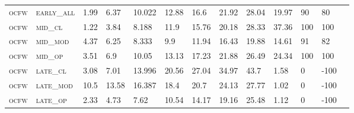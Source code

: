 \begin{landscape}
\begin{table}[!htbp]
\begin{tabular}{@{}lllllllllllll@{}}
\footnotesize \textsc{ocfw}        & \footnotesize \textsc{early\_all}                & \footnotesize 1.99          & \footnotesize 6.37           & \footnotesize 10.022           & \footnotesize 12.88           & \footnotesize 16.6            & \footnotesize 21.92           & \footnotesize 28.04      & \footnotesize 19.97    & \footnotesize 90     & \footnotesize 80    \\
\footnotesize \textsc{ocfw}        & \footnotesize \textsc{mid\_cl   }                & \footnotesize 1.22          & \footnotesize 3.84           & \footnotesize 8.188            & \footnotesize 11.9            & \footnotesize 15.76           & \footnotesize 20.18           & \footnotesize 28.33      & \footnotesize 37.36    & \footnotesize 100    & \footnotesize 100    \\
\footnotesize \textsc{ocfw}        & \footnotesize \textsc{mid\_mod  }                & \footnotesize 4.37          & \footnotesize 6.25           & \footnotesize 8.333            & \footnotesize 9.9             & \footnotesize 11.94           & \footnotesize 16.43           & \footnotesize 19.88      & \footnotesize 14.61    & \footnotesize 91     & \footnotesize 82    \\
\footnotesize \textsc{ocfw}        & \footnotesize \textsc{mid\_op   }                & \footnotesize 3.51          & \footnotesize 6.9            & \footnotesize 10.05            & \footnotesize 13.13           & \footnotesize 17.23           & \footnotesize 21.88           & \footnotesize 26.49      & \footnotesize 24.34    & \footnotesize 100    & \footnotesize 100    \\
\footnotesize \textsc{ocfw}        & \footnotesize \textsc{late\_cl  }                & \footnotesize 3.08          & \footnotesize 7.01           & \footnotesize 13.996           & \footnotesize 20.56           & \footnotesize 27.04           & \footnotesize 34.97           & \footnotesize 43.7       & \footnotesize 1.58     & \footnotesize 0      & \footnotesize -100    \\
\footnotesize \textsc{ocfw}        & \footnotesize \textsc{late\_mod }                & \footnotesize 10.5          & \footnotesize 13.58          & \footnotesize 16.387           & \footnotesize 18.4            & \footnotesize 20.7            & \footnotesize 24.13           & \footnotesize 27.77      & \footnotesize 1.02     & \footnotesize 0      & \footnotesize -100    \\
\footnotesize \textsc{ocfw}        & \footnotesize \textsc{late\_op  }                & \footnotesize 2.33          & \footnotesize 4.73           & \footnotesize 7.62             & \footnotesize 10.54           & \footnotesize 14.17           & \footnotesize 19.16           & \footnotesize 25.48      & \footnotesize 1.12     & \footnotesize 0      & \footnotesize -100    \\

\end{tabular}
\end{table}
\end{landscape}
